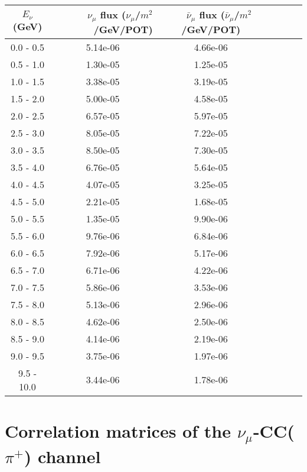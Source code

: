\documentclass[aps, prd, reprint,showpacs,  preprintnumbers,amsmath,amssymb,superscriptaddress, nofootinbib]{revtex4-1}
\makeatletter
\newcommand{\numu}{\mbox{$\nu_{\mu}$}}                   %
\renewenvironment{table}
  {\def\@captype{table}}
  {}
\makeatother
\begin{document}
\begin{table}
\centering
\begin{tabular}{crccccc}
\hline
$E_\nu$ (GeV) & ~~~$\nu_\mu$ flux ($\nu_\mu$/$m^2$/GeV/POT) & ~~~$\bar{\nu}_\mu$ flux ($\bar{\nu}_\mu$/$m^2$/GeV/POT)\\
\hline
  0.0 -   0.5 &  5.14e-06~~~~~~~ &  4.66e-06 \\ 
  0.5 -   1.0 &  1.30e-05~~~~~~~ &  1.25e-05 \\ 
  1.0 -   1.5 &  3.38e-05~~~~~~~ &  3.19e-05 \\ 
  1.5 -   2.0 &  5.00e-05~~~~~~~ &  4.58e-05 \\ 
  2.0 -   2.5 &  6.57e-05~~~~~~~ &  5.97e-05 \\ 
  2.5 -   3.0 &  8.05e-05~~~~~~~ &  7.22e-05 \\ 
  3.0 -   3.5 &  8.50e-05~~~~~~~ &  7.30e-05 \\ 
  3.5 -   4.0 &  6.76e-05~~~~~~~ &  5.64e-05 \\ 
  4.0 -   4.5 &  4.07e-05~~~~~~~ &  3.25e-05 \\ 
  4.5 -   5.0 &  2.21e-05~~~~~~~ &  1.68e-05 \\ 
  5.0 -   5.5 &  1.35e-05~~~~~~~ &  9.90e-06 \\ 
  5.5 -   6.0 &  9.76e-06~~~~~~~ &  6.84e-06 \\ 
  6.0 -   6.5 &  7.92e-06~~~~~~~ &  5.17e-06 \\ 
  6.5 -   7.0 &  6.71e-06~~~~~~~ &  4.22e-06 \\ 
  7.0 -   7.5 &  5.86e-06~~~~~~~ &  3.53e-06 \\ 
  7.5 -   8.0 &  5.13e-06~~~~~~~ &  2.96e-06 \\ 
  8.0 -   8.5 &  4.62e-06~~~~~~~ &  2.50e-06 \\ 
  8.5 -   9.0 &  4.14e-06~~~~~~~ &  2.19e-06 \\ 
  9.0 -   9.5 &  3.75e-06~~~~~~~ &  1.97e-06 \\ 
  9.5 -  10.0 &  3.44e-06~~~~~~~ &  1.78e-06 \\ 
\hline
\end{tabular}
\caption{The neutrino and antineutrino fluxes that are used for the cross-section calculations.
These fluxes are also used by the GENIE, NEUT, and NuWro event generators to produce the model predictions
shown in the paper.}
\label{flux-table}
\end{table}



\section{Correlation matrices of the $\numu$-CC($\pi^{+}$) channel}
\end{document}
